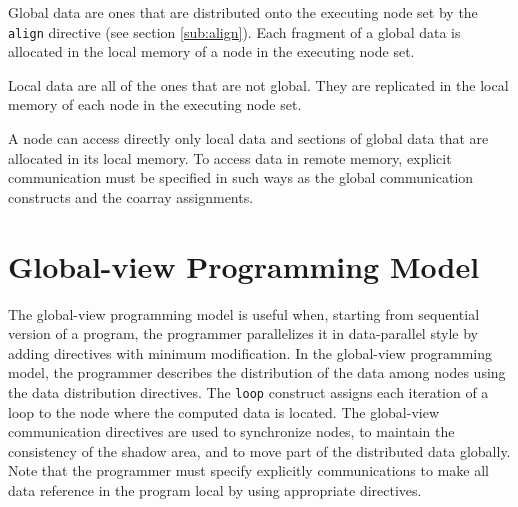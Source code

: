 Global data are ones that are distributed onto the executing node set by
the {\tt align} directive (see section \ref{sub:align}). Each fragment
of a global data is allocated in the local memory of a node in the
executing node set.
%
%

Local data are all of the ones that are not global. They are replicated
in the local memory of each node in the executing node set.


A node can access directly only local data and sections of global data
that are allocated in its local memory.
%
To access data in remote memory, explicit communication must be
specified in such ways as the global communication constructs and
the coarray assignments.


\section{Global-view Programming Model}

The global-view programming model is useful when, starting from
sequential version of a program, the programmer parallelizes it in
data-parallel style by adding directives with minimum modification.
%
In the global-view programming model, the programmer describes the
distribution of the data among nodes using the data distribution
directives.
%
The {\tt loop} construct assigns each iteration of a loop to the node
where the computed data is located. 
%
The global-view communication directives are used to synchronize nodes,
to maintain the consistency of the shadow area, and to move part of the
distributed data globally.
%
Note that the programmer must specify explicitly communications to make
all data reference in the program local by using appropriate directives.

